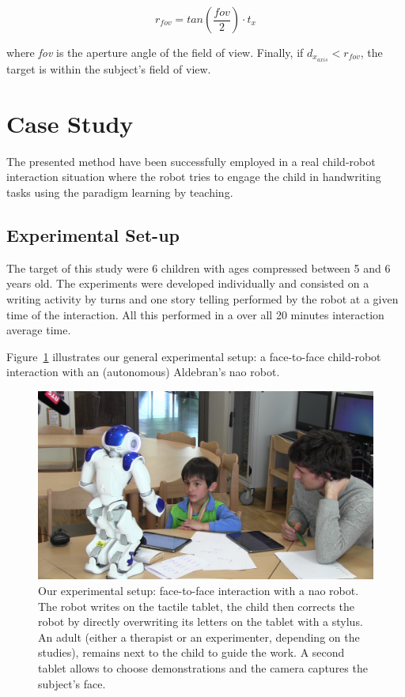 \documentclass{sig-alternate}
\begin{document}
\begin{equation}
r_{fov} = tan\left(\frac{fov}{2}\right) \cdot t_x
\label{eq:fovtf}
\end{equation}

where \textit{fov} is the aperture angle of the field of view. Finally, if $ d_{x_{axis}}<r_{fov} $, the target is within the subject's field of view.


\section{Case Study}
The presented method have been successfully employed in a real child-robot interaction situation where the robot tries to engage the child in handwriting tasks using the paradigm learning by teaching.
\subsection{Experimental Set-up}

The target of this study were 6 children with ages compressed between 5 and 6 years old. The experiments were developed individually and consisted on a writing activity by turns and one story telling performed by the robot at a given time of the interaction. All this performed in a over all 20 minutes interaction average time.

Figure~\ref{realSetup} illustrates our general experimental setup: a
face-to-face child-robot interaction with an (autonomous) Aldebran's {\sc nao}
robot.

\begin{figure}
    \centering
    \includegraphics[width=1\columnwidth]{realSetup}
    \caption{\small Our experimental setup: face-to-face interaction with a {\sc
            nao} robot.  The robot writes on the tactile tablet, the child then
            corrects the robot by directly overwriting its letters on the tablet
            with a stylus. An adult (either a therapist or an experimenter,
            depending on the studies), remains next to the child to guide the work. 
            A second tablet allows to choose demonstrations and the camera captures the subject's face.}
    \label{realSetup}
\end{figure}
\end{document}

